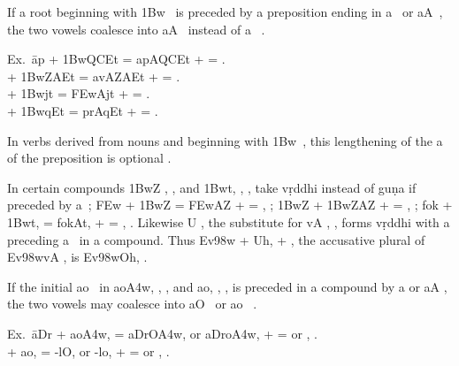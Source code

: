 \s If a root beginning with {\dn \31Bw}~ is preceded by a preposition
ending in {\dn a}~ or {\dn aA}~, the two vowels coalesce into
{\dn aA}~ instead of {\dn a}~ .

\begin{tabbing}
  Ex.\ \={\dn ap} + {\dn \31BwQCEt} = {\dn apAQC\0Et}  +  =
  .\\
   + {\dn \31BwZAEt} = {\dn avAZA\0Et}  +  =
  .\\
   + {\dn \31Bwjt\?} = {\dn \3FEwAj\0t\?}  +  =
  .\\
   + {\dn \31BwqEt} = {\dn prAq\0Et}  +  =
  .
\end{tabbing}

\begin{note}
  In verbs derived from nouns and beginning with {\dn \31Bw}~, this
  lengthening of the {\dn a}~ of the preposition is optional
  .

  In certain compounds {\dn \31BwZ\2} , , and {\dn \31Bwt,}
  , , take vṛddhi instead of guṇa if preceded by
  {\dn a}~; {\dn \3FEw} + {\dn \31BwZ\2} = {\dn \3FEwAZ{\rdt}}  +  =
  , ; {\dn \31BwZ\2} + {\dn \31BwZAZ\2}
   +  = , ; {\dn fok} + {\dn \31Bwt,} = {\dn fokAt\0,}
   +  = , .
  Likewise {\dn U} , the substitute for {\dn vA} ,
  , forms vṛddhi with a preceding {\dn a}~ in a
  compound. Thus {\dn Ev\398w} + {\dn Uh,}  + , the
  accusative plural of {\dn Ev\398wvA} , is {\dn Ev\398wOh,}
   .
\end{note}

\s If the initial {\dn ao}~ in {\dn ao\3A4w,} , , and
{\dn ao,} , , is preceded in a compound by {\dn a} or {\dn aA}
, the two vowels may coalesce into {\dn aO}~ or
{\dn ao}~ .

\begin{tabbing}
  Ex.\ \={\dn aDr} + {\dn ao\3A4w,} = {\dn aDrO\3A4w,} or {\dn aDro\3A4w,}
   +  =  or ,
  .\\
   + {\dn ao,} = {\dn -lO,} or {\dn -lo,}  +
   =  or , .
\end{tabbing}

